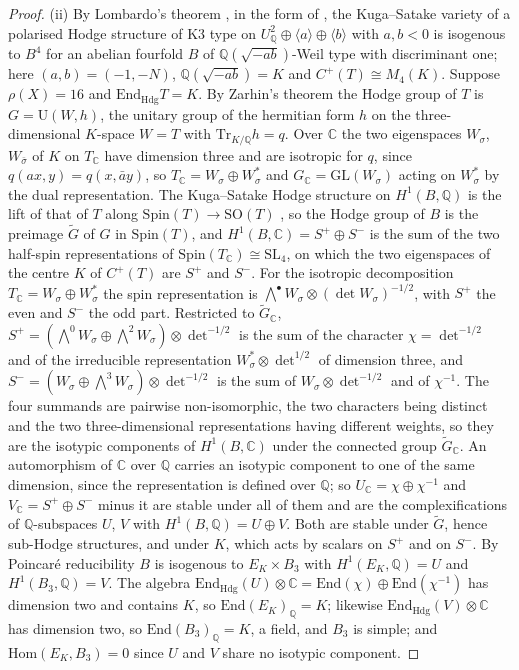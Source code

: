 \documentclass[11pt,reqno]{amsart}
\numberwithin{equation}{section}
\theoremstyle{plain}
\theoremstyle{definition}
\newcommand{\QQ}{\mathbb{Q}}
\newcommand{\CC}{\mathbb{C}}
\newcommand{\Hdg}{\mathrm{Hdg}}
\newcommand{\Hom}{\mathrm{Hom}}
\newcommand{\End}{\mathrm{End}}
\newcommand{\Tr}{\mathrm{Tr}}
\newcommand{\SL}{\mathrm{SL}}
\begin{document}
\begin{proof}
(ii) By Lombardo's theorem \cite[Thms.~6.2, 6.4]{Lom01}, in the form of \cite[Thm.~4.1]{Var25}, the Kuga--Satake variety of a polarised Hodge structure of K3 type on $U_{\QQ}^{2}\oplus\langle a\rangle\oplus\langle b\rangle$ with $a,b<0$ is isogenous to $B^{4}$ for an abelian fourfold $B$ of $\QQ(\sqrt{-ab})$-Weil type with discriminant one; here $(a,b)=(-1,-N)$, $\QQ(\sqrt{-ab})=K$ and $C^{+}(T)\cong M_{4}(K)$. Suppose $\rho(X)=16$ and $\End_{\Hdg}T=K$. By Zarhin's theorem \cite[Thm.~2.3.1]{Zar83} the Hodge group of $T$ is $G=\mathrm{U}(W,h)$, the unitary group of the hermitian form $h$ on the three-dimensional $K$-space $W=T$ with $\Tr_{K/\QQ}h=q$. Over $\CC$ the two eigenspaces $W_{\sigma}$, $W_{\bar\sigma}$ of $K$ on $T_{\CC}$ have dimension three and are isotropic for $q$, since $q(ax,y)=q(x,\bar ay)$, so $T_{\CC}=W_{\sigma}\oplus W_{\sigma}^{*}$ and $G_{\CC}=\mathrm{GL}(W_{\sigma})$ acting on $W_{\sigma}^{*}$ by the dual representation. The Kuga--Satake Hodge structure on $H^{1}(B,\QQ)$ is the lift of that of $T$ along $\mathrm{Spin}(T)\to\mathrm{SO}(T)$ \cite[\S5]{vG08}, so the Hodge group of $B$ is the preimage $\widetilde G$ of $G$ in $\mathrm{Spin}(T)$, and $H^{1}(B,\CC)=S^{+}\oplus S^{-}$ is the sum of the two half-spin representations of $\mathrm{Spin}(T_{\CC})\cong\SL_{4}$, on which the two eigenspaces of the centre $K$ of $C^{+}(T)$ are $S^{+}$ and $S^{-}$. For the isotropic decomposition $T_{\CC}=W_{\sigma}\oplus W_{\sigma}^{*}$ the spin representation is $\bigwedge^{\bullet}W_{\sigma}\otimes(\det W_{\sigma})^{-1/2}$, with $S^{+}$ the even and $S^{-}$ the odd part. Restricted to $\widetilde G_{\CC}$, $S^{+}=(\bigwedge^{0}W_{\sigma}\oplus\bigwedge^{2}W_{\sigma})\otimes\det^{-1/2}$ is the sum of the character $\chi=\det^{-1/2}$ and of the irreducible representation $W_{\sigma}^{*}\otimes\det^{1/2}$ of dimension three, and $S^{-}=(W_{\sigma}\oplus\bigwedge^{3}W_{\sigma})\otimes\det^{-1/2}$ is the sum of $W_{\sigma}\otimes\det^{-1/2}$ and of $\chi^{-1}$. The four summands are pairwise non-isomorphic, the two characters being distinct and the two three-dimensional representations having different weights, so they are the isotypic components of $H^{1}(B,\CC)$ under the connected group $\widetilde G_{\CC}$. An automorphism of $\CC$ over $\QQ$ carries an isotypic component to one of the same dimension, since the representation is defined over $\QQ$; so $U_{\CC}=\chi\oplus\chi^{-1}$ and $V_{\CC}=S^{+}\oplus S^{-}$ minus it are stable under all of them and are the complexifications of $\QQ$-subspaces $U$, $V$ with $H^{1}(B,\QQ)=U\oplus V$. Both are stable under $\widetilde G$, hence sub-Hodge structures, and under $K$, which acts by scalars on $S^{+}$ and on $S^{-}$. By Poincar\'e reducibility $B$ is isogenous to $E_{K}\times B_{3}$ with $H^{1}(E_{K},\QQ)=U$ and $H^{1}(B_{3},\QQ)=V$. The algebra $\End_{\Hdg}(U)\otimes\CC=\End(\chi)\oplus\End(\chi^{-1})$ has dimension two and contains $K$, so $\End(E_{K})_{\QQ}=K$; likewise $\End_{\Hdg}(V)\otimes\CC$ has dimension two, so $\End(B_{3})_{\QQ}=K$, a field, and $B_{3}$ is simple; and $\Hom(E_{K},B_{3})=0$ since $U$ and $V$ share no isotypic component.
\end{proof}
\end{document}
